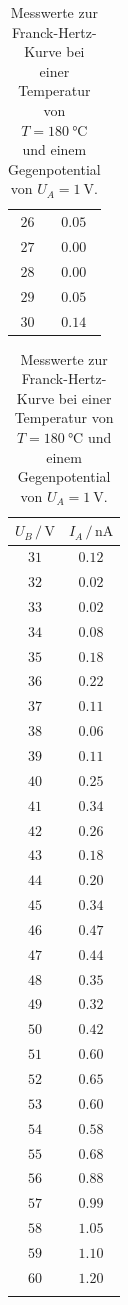 \begin{table}
\begin{tabular}{cc|}
        $26$ & $0.05$ \\
        $27$ & $0.00$ \\
        $28$ & $0.00$ \\
        $29$ & $0.05$ \\
        $30$ & $0.14$ \\
        \bottomrule
    \end{tabular}
        \begin{tabular}{|cc}
        \toprule
        $U_B \,/\, \si{\volt}$ & $I_A \,/\, \si{\nano\ampere}$ \\
        \midrule
        $31$ & $0.12$ \\
        $32$ & $0.02$ \\
        $33$ & $0.02$ \\
        $34$ & $0.08$ \\
        $35$ & $0.18$ \\
        $36$ & $0.22$ \\
        $37$ & $0.11$ \\
        $38$ & $0.06$ \\
        $39$ & $0.11$ \\
        $40$ & $0.25$ \\
        $41$ & $0.34$ \\
        $42$ & $0.26$ \\
        $43$ & $0.18$ \\
        $44$ & $0.20$ \\
        $45$ & $0.34$ \\
        $46$ & $0.47$ \\
        $47$ & $0.44$ \\
        $48$ & $0.35$ \\
        $49$ & $0.32$ \\
        $50$ & $0.42$ \\
        $51$ & $0.60$ \\
        $52$ & $0.65$ \\
        $53$ & $0.60$ \\
        $54$ & $0.58$ \\
        $55$ & $0.68$ \\
        $56$ & $0.88$ \\
        $57$ & $0.99$ \\
        $58$ & $1.05$ \\
        $59$ & $1.10$ \\
        $60$ & $1.20$ \\
             &        \\
        \bottomrule
    \end{tabular}
    \caption{Messwerte zur Franck-Hertz-Kurve bei einer Temperatur von $T = \SI{180}{\degreeCelsius}$ und einem Gegenpotential von $U_A = \SI{1}{\volt}$. \cite{matplotlib}\cite{scipy}\cite{uncertainties}\cite{numpy}}
    \label{tab:franck_hertz}
\end{table}

